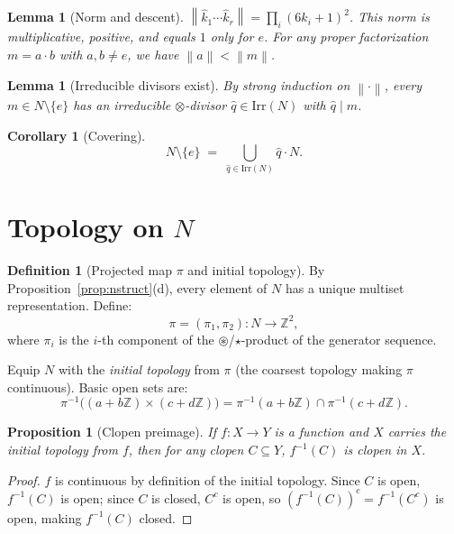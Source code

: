 \documentclass[12pt,a4paper]{amsart}
\theoremstyle{plain}
\newtheorem{lemma}[theorem]{Lemma}
\newtheorem{proposition}[theorem]{Proposition}
\newtheorem{corollary}[theorem]{Corollary}
\theoremstyle{definition}
\newtheorem{definition}[theorem]{Definition}
\theoremstyle{remark}
\newcommand{\circstar}{\mathbin{\circledast}}
\newcommand{\bstar}{\mathbin{\star}}
\newcommand{\Irr}{\mathrm{Irr}}
\newcommand{\qhat}[1]{\widehat{#1}}
\newcommand{\norm}[1]{\left\|#1\right\|}
\newcommand{\bbZ}{\mathbb{Z}}
\begin{document}
\begin{lemma}[Norm and descent]
$\norm{\qhat{k}_1 \cdots \qhat{k}_r} = \prod_i (6k_i+1)^2$.
This norm is multiplicative, positive, and equals $1$ only for $e$.
For any proper factorization $m = a \cdot b$ with $a, b \neq e$, we have
$\norm{a} < \norm{m}$.
\end{lemma}

\begin{lemma}[Irreducible divisors exist]
By strong induction on $\norm{\cdot}$, every $m \in N \setminus \{e\}$
has an irreducible $\otimes$-divisor $\qhat{q} \in \Irr(N)$ with
$\qhat{q} \mid m$.
\end{lemma}

\begin{corollary}[Covering]
\label{cor:covering}
$$N \setminus \{e\} \;=\; \bigcup_{\qhat{q} \in \Irr(N)} \qhat{q} \cdot N.$$
\end{corollary}

\section{Topology on $N$}

\begin{definition}[Projected map $\pi$ and initial topology]
By Proposition~\ref{prop:nstruct}(d), every element of $N$ has a unique
multiset representation. Define:
$$\pi = (\pi_1, \pi_2) : N \to \bbZ^2,$$
where $\pi_i$ is the $i$-th component of the $\circstar$/$\bstar$-product
of the generator sequence.

Equip $N$ with the \emph{initial topology} from $\pi$ (the coarsest
topology making $\pi$ continuous). Basic open sets are:
$$\pi^{-1}\!\bigl((a + b\bbZ) \times (c + d\bbZ)\bigr) =
  \pi^{-1}(a + b\bbZ) \cap \pi^{-1}(c + d\bbZ).$$
\end{definition}

\begin{proposition}[Clopen preimage]
\label{prop:clopen-pre}
If $f\colon X \to Y$ is a function and $X$ carries the initial topology
from $f$, then for any clopen $C \subseteq Y$, $f^{-1}(C)$ is clopen
in $X$.
\end{proposition}
\begin{proof}
$f$ is continuous by definition of the initial topology. Since $C$ is
open, $f^{-1}(C)$ is open; since $C$ is closed, $C^c$ is open, so
$(f^{-1}(C))^c = f^{-1}(C^c)$ is open, making $f^{-1}(C)$ closed.
\end{proof}
\end{document}
